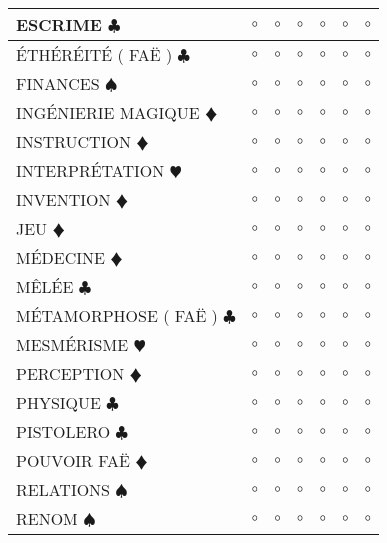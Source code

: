 \documentclass[a5paper]{letter}
\begin{document}
\begin{tabular}[c]{|p{}|p{}|p{}|p{}|p{}|p{}|p{}|}
	ESCRIME { $\clubsuit$ }								&	$\circ$	&	$\circ$	&	$\circ$	&	$\circ$	&	$\circ$		&	$\circ$		\\ \hline
	ÉTHÉRÉITÉ ( FAË ) { $\clubsuit$ }					&	$\circ$	&	$\circ$	&	$\circ$	&	$\circ$	&	$\circ$		&	$\circ$		\\ \hline
	FINANCES { $\spadesuit$ }							&	$\circ$	&	$\circ$	&	$\circ$	&	$\circ$	&	$\circ$		&	$\circ$		\\ \hline
	INGÉNIERIE MAGIQUE {\color{red} $\vardiamond$ }		&	$\circ$	&	$\circ$	&	$\circ$	&	$\circ$	&	$\circ$		&	$\circ$		\\ \hline
	INSTRUCTION {\color{red} $\vardiamond$ }			&	$\circ$	&	$\circ$	&	$\circ$	&	$\circ$	&	$\circ$		&	$\circ$		\\ \hline
	INTERPRÉTATION {\color{red} $\varheart$ }			&	$\circ$	&	$\circ$	&	$\circ$	&	$\circ$	&	$\circ$		&	$\circ$		\\ \hline
	INVENTION {\color{red} $\vardiamond$ }				&	$\circ$	&	$\circ$	&	$\circ$	&	$\circ$	&	$\circ$		&	$\circ$		\\ \hline
	JEU {\color{red} $\vardiamond$ }					&	$\circ$	&	$\circ$	&	$\circ$	&	$\circ$	&	$\circ$		&	$\circ$		\\ \hline
	MÉDECINE {\color{red} $\vardiamond$ }				&	$\circ$	&	$\circ$	&	$\circ$	&	$\circ$	&	$\circ$		&	$\circ$		\\ \hline
	MÊLÉE { $\clubsuit$ }								&	$\circ$	&	$\circ$	&	$\circ$	&	$\circ$	&	$\circ$		&	$\circ$		\\ \hline
	MÉTAMORPHOSE ( FAË ) { $\clubsuit$ }				&	$\circ$	&	$\circ$	&	$\circ$	&	$\circ$	&	$\circ$		&	$\circ$		\\ \hline
	MESMÉRISME {\color{red} $\varheart$ }				&	$\circ$	&	$\circ$	&	$\circ$	&	$\circ$	&	$\circ$		&	$\circ$		\\ \hline
	PERCEPTION {\color{red} $\vardiamond$ }				&	$\circ$	&	$\circ$	&	$\circ$	&	$\circ$	&	$\circ$		&	$\circ$		\\ \hline
	PHYSIQUE { $\clubsuit$ }							&	$\circ$	&	$\circ$	&	$\circ$	&	$\circ$	&	$\circ$		&	$\circ$		\\ \hline
	PISTOLERO { $\clubsuit$ }							&	$\circ$	&	$\circ$	&	$\circ$	&	$\circ$	&	$\circ$		&	$\circ$		\\ \hline
	POUVOIR FAË {\color{red} $\vardiamond$ }			&	$\circ$	&	$\circ$	&	$\circ$	&	$\circ$	&	$\circ$		&	$\circ$		\\ \hline
	RELATIONS { $\spadesuit$ }							&	$\circ$	&	$\circ$	&	$\circ$	&	$\circ$	&	$\circ$		&	$\circ$		\\ \hline
	RENOM { $\spadesuit$ }								&	$\circ$	&	$\circ$	&	$\circ$	&	$\circ$	&	$\circ$		&	$\circ$		\\ \hline

\end{tabular}
\end{document}
